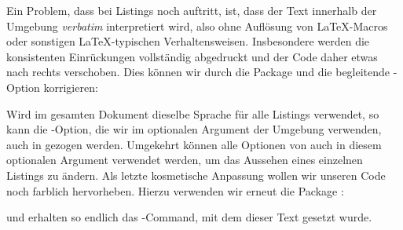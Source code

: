 Ein Problem, dass bei Listings noch auftritt, ist, dass der Text innerhalb der Umgebung \emph{verbatim} interpretiert wird, also ohne Auflösung von \LaTeX{}-Macros oder sonstigen \LaTeX{}-typischen Verhaltensweisen.
Insbesondere werden die konsistenten Einrückungen vollständig abgedruckt und der Code daher etwas nach rechts verschoben.
Dies können wir durch die Package  und die begleitende -Option  korrigieren:
\begin{latexlisting}
	\usepackage{listings}
	\usepackage{lstautogobble}
	\lstset{
	    basicstyle=\ttfamily\footnotesize,
		...,
		tabsize=4,
		autogobble,
	}
\end{latexlisting}
Wird im gesamten Dokument dieselbe Sprache für alle Listings verwendet, so kann die -Option, die wir im optionalen Argument der Umgebung verwenden, auch in  gezogen werden.
Umgekehrt können alle Optionen von  auch in diesem optionalen Argument verwendet werden, um das Aussehen eines einzelnen Listings zu ändern.
Als letzte kosmetische Anpassung wollen wir unseren Code noch farblich hervorheben.
Hierzu verwenden wir erneut die Package :
\begin{latexlisting}
	\usepackage{listings}
	\usepackage{lstautogobble}
	\usepackage{xcolor}
\end{latexlisting}
und erhalten so endlich das -Command, mit dem dieser Text gesetzt wurde.
